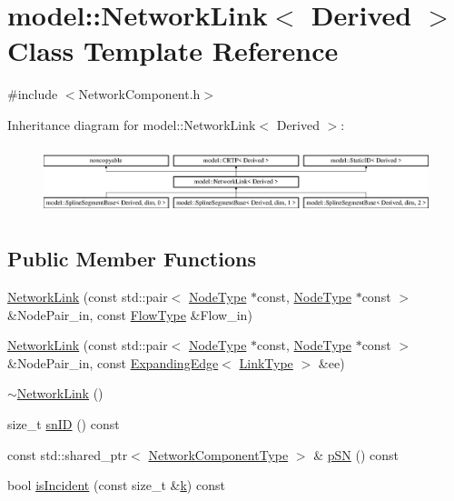\hypertarget{classmodel_1_1_network_link}{}\section{model\+:\+:Network\+Link$<$ Derived $>$ Class Template Reference}
\label{classmodel_1_1_network_link}


{\ttfamily \#include $<$Network\+Component.\+h$>$}

Inheritance diagram for model\+:\+:Network\+Link$<$ Derived $>$\+:\begin{figure}[H]
\begin{center}
\leavevmode
\includegraphics[height=1.978799cm]{classmodel_1_1_network_link}
\end{center}
\end{figure}
\subsection*{Public Member Functions}
\begin{DoxyCompactItemize}
\item 
\hyperlink{classmodel_1_1_network_link_a5c6b29e7b842d4c07f998098c2dfa1d3}{Network\+Link} (const std\+::pair$<$ \hyperlink{_network_typedefs_8h_a723f680c66f6a92647827790bcbafce0}{Node\+Type} $\ast$const, \hyperlink{_network_typedefs_8h_a723f680c66f6a92647827790bcbafce0}{Node\+Type} $\ast$const  $>$ \&Node\+Pair\+\_\+in, const \hyperlink{_spline_segment_base__common_8h_aec2b17f3c09c54f93636cbedceffde56}{Flow\+Type} \&Flow\+\_\+in)
\item 
\hyperlink{classmodel_1_1_network_link_aec5157cd0bd40ad5264f4e6080b44f2b}{Network\+Link} (const std\+::pair$<$ \hyperlink{_network_typedefs_8h_a723f680c66f6a92647827790bcbafce0}{Node\+Type} $\ast$const, \hyperlink{_network_typedefs_8h_a723f680c66f6a92647827790bcbafce0}{Node\+Type} $\ast$const  $>$ \&Node\+Pair\+\_\+in, const \hyperlink{structmodel_1_1_expanding_edge}{Expanding\+Edge}$<$ \hyperlink{_spline_node_base__corder0_8h_ab09ccc0af6ea9402dfef7b0eac55cff3}{Link\+Type} $>$ \&ee)
\item 
\hyperlink{classmodel_1_1_network_link_a4e5aad41de186df2d4f9bfbc03c14060}{$\sim$\+Network\+Link} ()
\item 
size\+\_\+t \hyperlink{classmodel_1_1_network_link_af78d2c702efb5cc6afff6b0ae6d95b74}{sn\+I\+D} () const 
\item 
const std\+::shared\+\_\+ptr$<$ \hyperlink{_network_typedefs_8h_ace62a87e27b01659142c49a8712f3dc9}{Network\+Component\+Type} $>$ \& \hyperlink{classmodel_1_1_network_link_a9c6794cda822e287e1e2222558a2f74e}{p\+S\+N} () const 
\item 
bool \hyperlink{classmodel_1_1_network_link_a916e66c681349482cde1c02006ff7311}{is\+Incident} (const size\+\_\+t \&\hyperlink{_f_e_m_2linear__elasticity__3d_2tetgen_2generate_p_o_l_ycube_8m_a5d2aad4440da75aa43f2643e72b1a3bd}{k}) const 
\end{DoxyCompactItemize}
